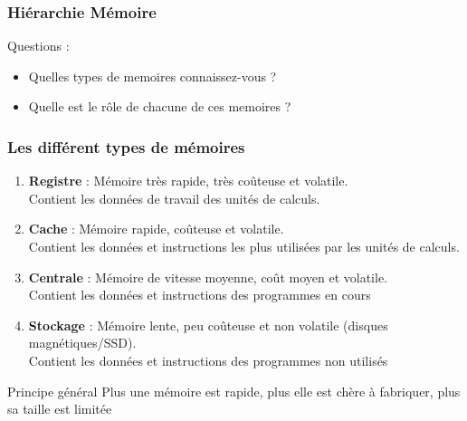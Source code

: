 \documentclass[10pt]{beamer}
\begin{document}
\begin{frame}
    \frametitle{Hiérarchie Mémoire}

    Questions :
    \begin{itemize}
        \item Quelles types de memoires connaissez-vous ?
        \item Quelle est le r\^ole de chacune de ces memoires ?
    \end{itemize}
\end{frame}

\begin{frame}
    \frametitle{Les différent types de mémoires}
    \begin{enumerate}
        \item \textbf{Registre} : Mémoire très rapide, très coûteuse et
              volatile. \\
              Contient les données de travail des unités de calculs.
        \item \textbf{Cache} : Mémoire rapide, coûteuse et volatile. \\
              Contient les données et instructions les plus utilisées par les
              unités de calculs.
        \item \textbf{Centrale} : Mémoire de vitesse moyenne, coût moyen et
              volatile. \\
              Contient les données et instructions des programmes en cours
        \item \textbf{Stockage} : Mémoire lente, peu coûteuse et non volatile
              (disques
              magnétiques/SSD). \\
              Contient les données et instructions des programmes non utilisés
    \end{enumerate}
    \begin{block}{Principe général}
        Plus une m\'emoire est rapide, plus elle est ch\`ere \`a
        fabriquer, plus sa taille est limit\'ee
    \end{block}

\end{frame}
\end{document}
